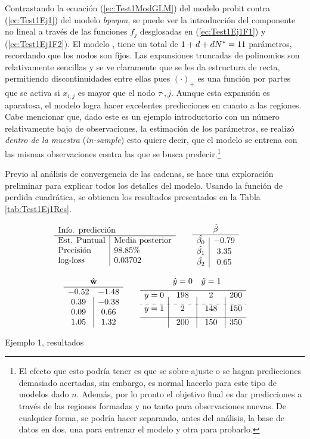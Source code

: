 \documentclass[../Main/Main.tex]{subfiles}
\begin{document}
Contrastando la ecuación (\ref{ec:Test1ModGLM}) del modelo probit  contra (\ref{ec:Test1Ej1}) del modelo \textit{bpwpm}, se puede ver la introducción del componente no lineal a través de las funciones $f_j$ desglosadas en (\ref{ec:Test1Ej1F1}) y (\ref{ec:Test1Ej1F2}). El modelo , tiene un total de $1 + d + dN^* = 11$ parámetros, recordando que los nodos son fijos. Las expansiones truncadas de polinomios son relativamente sencillas y se ve claramente que se les da estructura de recta, permitiendo discontinuidades entre ellas pues $(\cdot)_+$ es una función por partes que se activa si $x_{i,j}$ es mayor que el nodo $\tau{\cdot,j}$. Aunque esta expansión es aparatosa, el modelo logra hacer excelentes predicciones en cuanto a las regiones. Cabe mencionar que, dado este es un ejemplo introductorio con un número relativamente bajo de observaciones, la estimación de los parámetros, se realizó \textit{dentro de la muestra} (\textit{in-sample}) esto quiere decir, que el modelo se entrena con las mismas observaciones contra las que se busca predecir.\footnote{El efecto que esto podría tener es que se sobre-ajuste o se hagan predicciones demasiado acertadas, sin embargo, es normal hacerlo para este tipo de modelos dado $n$. Además, por lo pronto el objetivo final es dar predicciones a través de las regiones formadas y no tanto para observaciones nuevas. De cualquier forma, se podría hacer separando, antes del análisis, la base de datos en dos, una para entrenar el modelo y otra para probarlo.} 

Previo al análisis de convergencia de las cadenas, se hace una exploración preliminar para explicar todos los detalles del modelo. Usando la función de perdida cuadrática, se obtienen los resultados presentados en la Tabla \ref{tab:Test1Ej1Res}.

\begin{table}[h]
\begin{align*}
\resultados{\text{Media posterior}}{98.85}{0.03702}
\quad\quad
\begin{array}{c|c}
\multicolumn{2}{c}{\hat{\beta}} \\
\hline
\hat{\beta_0} & -0.79 \\
\hat{\beta_1} & 3.35 \\
\hat{\beta_2} & 0.65 \\
\end{array}
\quad\quad
\end{align*} 

\begin{align*}
\begin{array}{c|c}
\multicolumn{2}{c}{\hat{\wsn}} \\
\hline
-0.52 	& -1.48 \\
0.39	& -0.38 \\
0.09	& 0.66 \\
1.05	& 1.32
\end{array}
\quad\quad
\matconf{198}{2}{200}{2}{148}{150}{200}{150}{350}
\end{align*}
\caption{Ejemplo 1, resultados}
\label{tab:Test1Ej1Res}
\end{table}
\end{document}

